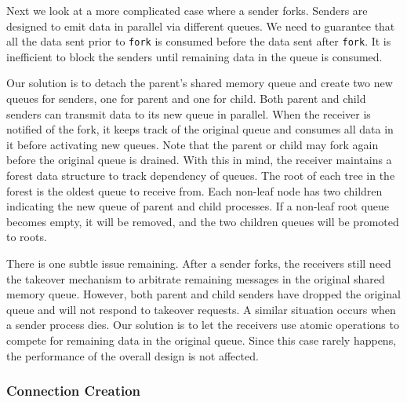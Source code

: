 Next we look at a more complicated case where a sender forks. Senders are designed to emit data in parallel via different queues. We need to guarantee that all the data sent prior to \texttt{fork} is consumed before the data sent after \texttt{fork}. It is inefficient to block the senders until remaining data in the queue is consumed.

Our solution is to detach the parent's shared memory queue and create two new queues for senders, one for parent and one for child. Both parent and child senders can transmit data to its new queue in parallel. When the receiver is notified of the fork, it keeps track of the original queue and consumes all data in it before activating new queues. Note that the parent or child may fork again before the original queue is drained. With this in mind, the receiver maintains a forest data structure to track dependency of queues. The root of each tree in the forest is the oldest queue to receive from. Each non-leaf node has two children indicating the new queue of parent and child processes. If a non-leaf root queue becomes empty, it will be removed, and the two children queues will be promoted to roots.

There is one subtle issue remaining. After a sender forks, the receivers still need the takeover mechanism to arbitrate remaining messages in the original shared memory queue. However, both parent and child senders have dropped the original queue and will not respond to takeover requests. A similar situation occurs when a sender process dies. Our solution is to let the receivers use atomic operations to compete for remaining data in the original queue. Since this case rarely happens, the performance of the overall design is not affected.



\subsubsection{Connection Creation}
\label{subsubsec:fork_new}

